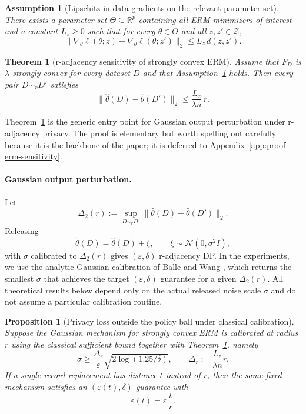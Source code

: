 \documentclass[conference,compsoc]{IEEEtran}
\newtheorem{assumption}{Assumption}
\newtheorem{theorem}{Theorem}
\newtheorem{proposition}{Proposition}
\begin{document}
\begin{assumption}[Lipschitz-in-data gradients on the relevant parameter set]
\label{ass:lz}
There exists a parameter set $\Theta\subseteq\mathbb{R}^p$ containing all ERM minimizers of interest and a constant $L_z\ge 0$ such that for every $\theta\in\Theta$ and all $z,z'\in\mathcal{Z}$,
\[
\|\nabla_\theta \ell(\theta;z)-\nabla_\theta \ell(\theta;z')\|_2\le L_z\,d(z,z').
\]
\end{assumption}

\begin{theorem}[r-adjacency sensitivity of strongly convex ERM]
\label{thm:erm-sensitivity}
Assume that $F_D$ is $\lambda$-strongly convex for every dataset $D$ and that Assumption~\ref{ass:lz} holds. Then every pair $D\sim_r D'$ satisfies
\[
\|\hat\theta(D)-\hat\theta(D')\|_2\le \frac{L_z}{\lambda n}\,r.
\]
\end{theorem}

Theorem~\ref{thm:erm-sensitivity} is the generic entry point for Gaussian output perturbation under r-adjacency privacy. The proof is elementary but worth spelling out carefully because it is the backbone of the paper; it is deferred to Appendix~\ref{app:proof-erm-sensitivity}.

\paragraph{Gaussian output perturbation.}
Let
\[
\Delta_2(r):=\sup_{D\sim_r D'} \|\hat\theta(D)-\hat\theta(D')\|_2.
\]
Releasing
\[
\widetilde\theta(D)=\hat\theta(D)+\xi,
\qquad
\xi\sim\mathcal{N}(0,\sigma^2 I),
\]
with $\sigma$ calibrated to $\Delta_2(r)$ gives $(\varepsilon,\delta)$ r-adjacency DP. In the experiments, we use the analytic Gaussian calibration of Balle and Wang \cite{balle2018analytic}, which returns the smallest $\sigma$ that achieves the target $(\varepsilon,\delta)$ guarantee for a given $\Delta_2(r)$. All theoretical results below depend only on the actual released noise scale $\sigma$ and do not assume a particular calibration routine.

\begin{proposition}[Privacy loss outside the policy ball under classical calibration]
\label{prop:outside-ball}
Suppose the Gaussian mechanism for strongly convex ERM is calibrated at radius $r$ using the classical sufficient bound together with Theorem~\ref{thm:erm-sensitivity}, namely
\[
\sigma\ge \frac{\Delta_r}{\varepsilon}\sqrt{2\log(1.25/\delta)},
\qquad
\Delta_r:=\frac{L_z}{\lambda n}r.
\]
If a single-record replacement has distance $t$ instead of $r$, then the same fixed mechanism satisfies an $(\varepsilon(t),\delta)$ guarantee with
\[
\varepsilon(t)=\varepsilon\,\frac{t}{r}.
\]
\end{proposition}
\end{document}
